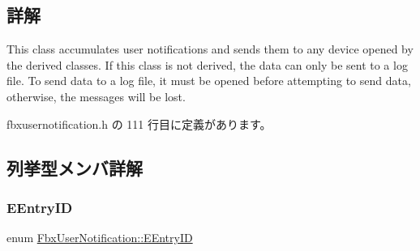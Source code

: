 \subsection{詳解}
This class accumulates user notifications and sends them to any device opened by the derived classes. If this class is not derived, the data can only be sent to a log file. To send data to a log file, it must be opened before attempting to send data, otherwise, the messages will be lost. 

 fbxusernotification.\+h の 111 行目に定義があります。



\subsection{列挙型メンバ詳解}
\mbox{\label{class_fbx_user_notification_a88d8e70c3d6881a5bfe7531079ac6831}} 
\subsubsection{\texorpdfstring{E\+Entry\+ID}{EEntryID}}
{\footnotesize\ttfamily enum \hyperlink{class_fbx_user_notification_a88d8e70c3d6881a5bfe7531079ac6831}{Fbx\+User\+Notification\+::\+E\+Entry\+ID}}

